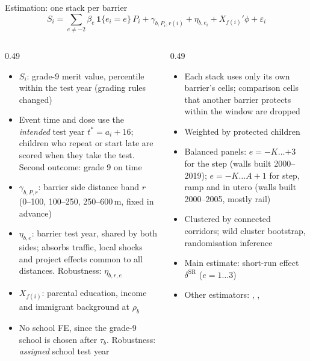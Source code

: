 \documentclass[aspectratio=169, 10pt]{beamer}
\begin{document}
\begin{frame}{Estimation: one stack per barrier}
\footnotesize
\vspace{-0.4em}
\[
S_i = \sum_{e \neq -2} \beta_e\, \mathbf{1}\{e_i = e\}\, P_i + \gamma_{b,P_i,r(i)} + \eta_{b,e_i} + X_{f(i)}'\phi + \varepsilon_i
\]
\vspace{-1.2em}
\begin{columns}[T]
\begin{column}{0.49\textwidth}
\begin{itemize}\setlength{\itemsep}{0pt}
  \item $S_i$: grade-9 merit value, percentile within the test year (grading rules changed)
  \item Event time and dose use the \emph{intended} test year $t^* = a_i + 16$; children who repeat or start late are scored when they take the test. Second outcome: grade 9 on time
  \item $\gamma_{b,P,r}$: barrier \texttimes{} side \texttimes{} distance band $r$ (0--100, 100--250, 250--600\,m, fixed in advance)
  \item $\eta_{b,e}$: barrier \texttimes{} test year, shared by both sides; absorbs traffic, local shocks and project effects common to all distances. Robustness: $\eta_{b,r,e}$
  \item $X_{f(i)}$: parental education, income and immigrant background at $\rho_b$
  \item No school FE, since the grade-9 school is chosen after $\tau_b$. Robustness: \emph{assigned} school \texttimes{} test year
\end{itemize}
\end{column}
\begin{column}{0.49\textwidth}
\begin{itemize}\setlength{\itemsep}{0pt}
  \item Each stack uses only its own barrier's cells; comparison cells that another barrier protects within the window are dropped \parencite{cengizEffectMinimumWages2019}
  \item Weighted by protected children \parencite{wingStackedDifferenceinDifferences2024}
  \item Balanced panels: $e = -K \dots {+3}$ for the step (walls built 2000--2019); $e = -K \dots A{+}1$ for step, ramp and in utero (walls built 2000--2005, mostly rail)
  \item Clustered by connected corridors; wild cluster bootstrap, randomisation inference
  \item Main estimate: short-run effect $\delta^{\text{SR}}$ ($e = 1 \dots 3$)
  \item Other estimators: \textcite{callawayDifferenceinDifferencesMultipleTime2021}, \textcite{sunEstimatingDynamicTreatment2021}, \textcite{borusyakRevisitingEventStudyDesigns2024}
\end{itemize}
\end{column}
\end{columns}
\end{frame}
\end{document}
